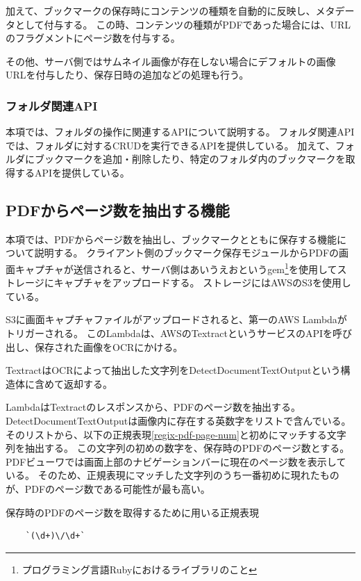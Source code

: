 加えて、ブックマークの保存時にコンテンツの種類を自動的に反映し、メタデータとして付与する。
この時、コンテンツの種類がPDFであった場合には、URLのフラグメントにページ数を付与する。

その他、サーバ側ではサムネイル画像が存在しない場合にデフォルトの画像URLを付与したり、保存日時の追加などの処理も行う。

\subsubsection{フォルダ関連API}
本項では、フォルダの操作に関連するAPIについて説明する。
フォルダ関連APIでは、フォルダに対するCRUDを実行できるAPIを提供している。
加えて、フォルダにブックマークを追加・削除したり、特定のフォルダ内のブックマークを取得するAPIを提供している。

\subsection{PDFからページ数を抽出する機能}
本項では、PDFからページ数を抽出し、ブックマークとともに保存する機能について説明する。
クライアント側のブックマーク保存モジュールからPDFの画面キャプチャが送信されると、サーバ側はあいうえおというgem\footnote{プログラミング言語Rubyにおけるライブラリのこと}を使用してストレージにキャプチャをアップロードする。
ストレージにはAWSのS3\cite{}を使用している。

S3に画面キャプチャファイルがアップロードされると、第一のAWS Lambdaがトリガーされる。
このLambdaは、AWSのTextract\cite{}というサービスのAPIを呼び出し、保存された画像をOCRにかける。

TextractはOCRによって抽出した文字列をDetectDocumentTextOutput\cite{}という構造体に含めて返却する。

LambdaはTextractのレスポンスから、PDFのページ数を抽出する。
DetectDocumentTextOutputは画像内に存在する英数字をリストで含んでいる。
そのリストから、以下の正規表現\ref{regix-pdf-page-num}と初めにマッチする文字列を抽出する。
この文字列の初めの数字を、保存時のPDFのページ数とする。
PDFビューワでは画面上部のナビゲーションバーに現在のページ数を表示している。
そのため、正規表現にマッチした文字列のうち一番初めに現れたものが、PDFのページ数である可能性が最も高い。

\begin{itembox}[l]{保存時のPDFのページ数を取得するために用いる正規表現}
  \label{regix-pdf-page-num}
  \begin{verbatim}
    `(\d+)\/\d+`
  \end{verbatim}
\end{itembox}

